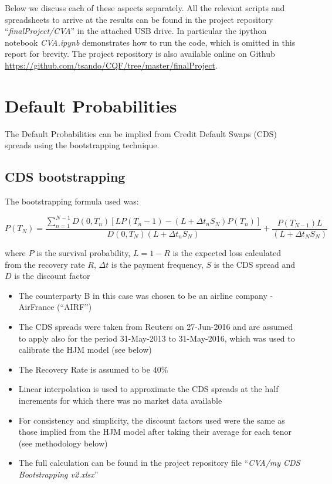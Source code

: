 \documentclass[reqno]{article}
\providecommand{\tightlist}{%
      \setlength{\itemsep}{0pt}\setlength{\parskip}{0pt}}
\begin{document}
Below we discuss each of these aspects separately. All the relevant scripts and spreadsheets to arrive at the results can be found in the project repository ``\emph{finalProject/CVA}'' in the attached USB drive. In particular the ipython notebook \emph{CVA.ipynb}  demonstrates how to run the code, which is omitted in this report for brevity. The project repository is also available online on Github \url{https://github.com/tsando/CQF/tree/master/finalProject}.


    \section{Default Probabilities}\label{default-probabilities}

The Default Probabilities can be implied from Credit Default Swaps (CDS)
spreads using the bootstrapping technique.

    \subsection{CDS bootstrapping}\label{cds-bootstrapping}

    The bootstrapping formula used was:

\begin{equation}
P(T_N) = \frac{ \sum^{N−1}_{n=1} D(0, T_n)
[ LP(T_n−1) − (L+ \Delta t_n S_N) P(T_n)]}
{ D(0, T_N)(L+ \Delta t_n S_N) }
+
\frac{P(T_{N−1})L}
{(L+\Delta t_N S_N)}
\end{equation}

where \(P\) is the survival probability, \(L = 1-R\) is the expected loss
calculated from the recovery rate \(R\), \(\Delta t\) is the payment
frequency, \(S\) is the CDS  spread and \(D\) is the discount factor

\begin{itemize}
\tightlist
\item
  The counterparty B in this case was chosen to be an airline company -
  AirFrance (``AIRF'')
\item
  The CDS spreads were taken from Reuters on 27-Jun-2016 and are assumed
  to apply also for the period 31-May-2013 to 31-May-2016, which was
  used to calibrate the HJM model (see below)
\item
  The Recovery Rate is assumed to be 40\%
\item
  Linear interpolation is used to approximate the CDS spreads at the
  half increments for which there was no market data available
\item
  For consistency and simplicity, the discount factors used were the
  same as those implied from the HJM model after taking their average
  for each tenor (see methodology below)
\item
  The full calculation can be found in the project repository file
  ``\emph{CVA/my CDS Bootstrapping v2.xlsx}''
\end{itemize}
\end{document}
